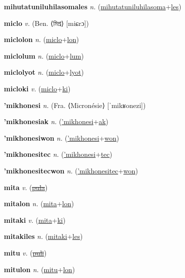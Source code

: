 \textbf{\hypertarget{mihutatuniluhilasomales}{mihutatuniluhilasomales}} \textit{n.} (\hyperlink{mihutatuniluhilasoma}{mihutatuniluhilasoma}+\allowbreak \hyperlink{les}{les})


\textbf{\hypertarget{miclo}{miclo}} \textit{v.} (Ben. ⟨{\bengali{}মিশ্র}⟩ [miɕrɔ])


\textbf{\hypertarget{miclolon}{miclolon}} \textit{n.} (\hyperlink{miclo}{miclo}+\allowbreak \hyperlink{lon}{lon})


\textbf{\hypertarget{miclolum}{miclolum}} \textit{n.} (\hyperlink{miclo}{miclo}+\allowbreak \hyperlink{lum}{lum})


\textbf{\hypertarget{miclolyot}{miclolyot}} \textit{n.} (\hyperlink{miclo}{miclo}+\allowbreak \hyperlink{lyot}{lyot})


\textbf{\hypertarget{micloki}{micloki}} \textit{v.} (\hyperlink{miclo}{miclo}+\allowbreak \hyperlink{ki}{ki})


\textbf{\hypertarget{'mikhonesi}{'mikhonesi}} \textit{n.} (Fra. ⟨Micronésie⟩ [ˈmikʁonezi])


\textbf{\hypertarget{'mikhonesiak}{'mikhonesiak}} \textit{n.} (\hyperlink{'mikhonesi}{'mikhonesi}+\allowbreak \hyperlink{ak}{ak})


\textbf{\hypertarget{'mikhonesiwon}{'mikhonesiwon}} \textit{n.} (\hyperlink{'mikhonesi}{'mikhonesi}+\allowbreak \hyperlink{won}{won})


\textbf{\hypertarget{'mikhonesitec}{'mikhonesitec}} \textit{n.} (\hyperlink{'mikhonesi}{'mikhonesi}+\allowbreak \hyperlink{tec}{tec})


\textbf{\hypertarget{'mikhonesitecwon}{'mikhonesitecwon}} \textit{n.} (\hyperlink{'mikhonesitec}{'mikhonesitec}+\allowbreak \hyperlink{won}{won})


\textbf{\hypertarget{mita}{mita}} \textit{v.} (\hyperlink{pula}{\sout{pula}})


\textbf{\hypertarget{mitalon}{mitalon}} \textit{n.} (\hyperlink{mita}{mita}+\allowbreak \hyperlink{lon}{lon})


\textbf{\hypertarget{mitaki}{mitaki}} \textit{v.} (\hyperlink{mita}{mita}+\allowbreak \hyperlink{ki}{ki})


\textbf{\hypertarget{mitakiles}{mitakiles}} \textit{n.} (\hyperlink{mitaki}{mitaki}+\allowbreak \hyperlink{les}{les})


\textbf{\hypertarget{mitu}{mitu}} \textit{v.} (\hyperlink{puli}{\sout{puli}})


\textbf{\hypertarget{mitulon}{mitulon}} \textit{n.} (\hyperlink{mitu}{mitu}+\allowbreak \hyperlink{lon}{lon})


